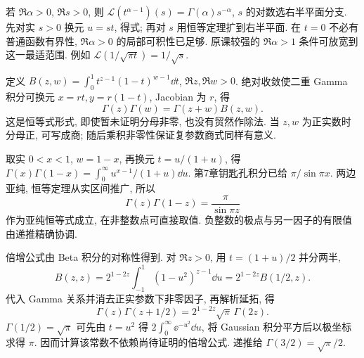 若 $\Re\alpha>0$, $\Re s>0$, 则 $\mathcal L(t^{\alpha-1})(s)=\Gamma(\alpha)s^{-\alpha}$, $s$ 的对数选右半平面分支. 先对实 $s>0$ 换元 $u=st$, 得式; 再对 $s$ 用恒等定理扩到右半平面. 在 $t=0$ 不必有普通函数有界性, $\Re\alpha>0$ 的局部可积性已足够. 原课较强的 $\Re\alpha>1$ 条件可放宽到这一最适范围. 例如 $\mathcal L(1/\sqrt{\pi t})=1/\sqrt s$.

定义 $B(z,w)=\int_0^1t^{z-1}(1-t)^{w-1}\dd t$, $\Re z,\Re w>0$. 绝对收敛使二重 Gamma 积分可换元 $x=r t,y=r(1-t)$, Jacobian 为 $r$, 得
\[
\Gamma(z)\Gamma(w)=\Gamma(z+w)B(z,w).
\]
这是恒等式形式, 即使暂未证明分母非零, 也没有贸然作除法. 当 $z,w$ 为正实数时分母正, 可写成商; 随后乘积非零性保证复参数商式同样有意义.

取实 $0<x<1$, $w=1-x$, 再换元 $t=u/(1+u)$, 得 $\Gamma(x)\Gamma(1-x)=\int_0^\infty u^{x-1}/(1+u)\dd u$. 第7章钥匙孔积分已给 $\pi/\sin\pi x$. 两边亚纯, 恒等定理从实区间推广, 所以
\[
\Gamma(z)\Gamma(1-z)=\frac\pi{\sin\pi z}
\]
作为亚纯恒等式成立, 在非整数点可直接取值. 负整数的极点与另一因子的有限值由递推精确协调.

倍增公式由 Beta 积分的对称性得到. 对 $\Re z>0$, 用 $t=(1+u)/2$ 并分两半,
\[
B(z,z)=2^{1-2z}\int_{-1}^1(1-u^2)^{z-1}\dd u
 =2^{1-2z}B(1/2,z).
\]
代入 Gamma 关系并消去正实参数下非零因子, 再解析延拓, 得
\[
\Gamma(z)\Gamma(z+1/2)=2^{1-2z}\sqrt\pi\,\Gamma(2z).
\]
$\Gamma(1/2)=\sqrt\pi$ 可先由 $t=u^2$ 得 $2\int_0^\infty\ee^{-u^2}\dd u$, 将 Gaussian 积分平方后以极坐标求得 $\pi$. 因而计算该常数不依赖尚待证明的倍增公式. 递推给 $\Gamma(3/2)=\sqrt\pi/2$.

